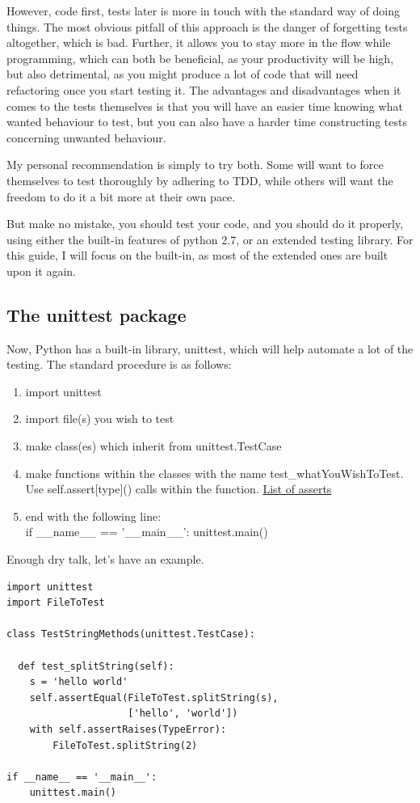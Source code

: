 \documentclass[10pt,a4paper]{article}
\begin{document}
However, code first, tests later is more in touch with the standard way of doing things. The most obvious pitfall of this approach is the danger of forgetting tests altogether, which is bad. Further, it allows you to stay more in the flow while programming, which can both be beneficial, as your productivity will be high, but also detrimental, as you might produce a lot of code that will need refactoring once you start testing it. The advantages and disadvantages when it comes to the tests themselves is that you will have an easier time knowing what wanted behaviour to test, but you can also have a harder time constructing tests concerning unwanted behaviour. 

My personal recommendation is simply to try both. Some will want to force themselves to test thoroughly by adhering to TDD, while others will want the freedom to do it a bit more at their own pace.

But make no mistake, you should test your code, and you should do it properly, using either the built-in features of python 2.7, or an extended testing library. For this guide, I will focus on the built-in, as most of the extended ones are built upon it again. 

\subsection{The unittest package}

Now, Python has a built-in library, unittest, which will help automate a lot of the testing. The standard procedure is as follows:
\begin{enumerate}
\item import unittest
\item import file(s) you wish to test
\item make class(es) which inherit from unittest.TestCase
\item make functions within the classes with the name test\_whatYouWishToTest. Use self.assert[type]() calls within the function. \href{https://docs.python.org/2/library/unittest.html\#unittest.TestCase.debug}{List of asserts}
\item end with the following line: \\
 if \_\_name\_\_ == '\_\_main\_\_': unittest.main()
\end{enumerate}

Enough dry talk, let's have an example.

\begin{lstlisting}
import unittest
import FileToTest

class TestStringMethods(unittest.TestCase):

  def test_splitString(self):
    s = 'hello world'
    self.assertEqual(FileToTest.splitString(s), 
                     ['hello', 'world'])
    with self.assertRaises(TypeError):
        FileToTest.splitString(2)

if __name__ == '__main__':
    unittest.main()

\end{lstlisting}
\end{document}
